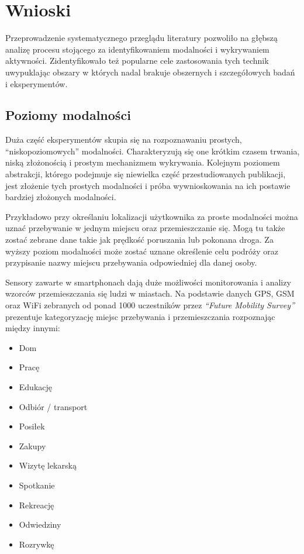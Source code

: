 \section{Wnioski}
Przeprowadzenie systematycznego przeglądu literatury pozwoliło na głębszą analizę procesu stojącego za identyfikowaniem modalności i wykrywaniem aktywności. Zidentyfikowało też popularne cele zastosowania tych technik uwypuklając obszary w których nadal brakuje obszernych i szczegółowych badań i eksperymentów.

\subsection{Poziomy modalności}
\label{sec:modality_levels}
Duża część eksperymentów skupia się na rozpoznawaniu prostych, ``niskopoziomowych'' modalności. Charakteryzują się one krótkim czasem trwania, niską złożonością i prostym mechanizmem wykrywania. Kolejnym poziomem abstrakcji, którego podejmuje się niewielka część przestudiowanych publikacji, jest złożenie tych prostych modalności i próba wywnioskowania na ich postawie bardziej złożonych modalności.

Przykładowo przy określaniu lokalizacji użytkownika za proste modalności można uznać przebywanie w jednym miejscu oraz przemieszczanie się. Mogą tu także zostać zebrane dane takie jak prędkość poruszania lub pokonana droga. Za wyższy poziom modalności może zostać uznane określenie celu podróży oraz przypisanie  nazwy miejscu przebywania odpowiedniej dla danej osoby.

Sensory zawarte w smartphonach dają duże możliwości monitorowania i analizy wzorców przemieszczania się ludzi w miastach. Na podstawie danych GPS, GSM oraz WiFi zebranych od ponad 1000 uczestników przez \textit{``Future Mobility Survey''} \cite{26_Mobility_Sensing} prezentuje kategoryzację miejsc przebywania i przemieszczania rozpoznając między innymi:
\begin{itemize}
    \item Dom
    \item Pracę
    \item Edukację
    \item Odbiór / transport
    \item Posiłek
    \item Zakupy
    \item Wizytę lekarską
    \item Spotkanie
    \item Rekreację
    \item Odwiedziny
    \item Rozrywkę
\end{itemize}

